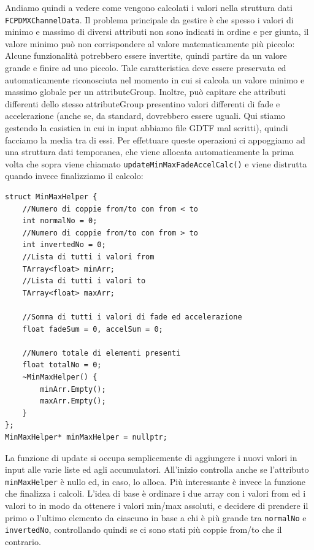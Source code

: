 \documentclass[main.tex]{subfiles}
\begin{document}
Andiamo quindi a vedere come vengono calcolati i valori nella struttura dati \lstinline{FCPDMXChannelData}. Il problema principale da gestire è che spesso i valori di minimo e massimo di diversi attributi non sono indicati in ordine e per giunta, il valore minimo può non corrispondere al valore matematicamente più piccolo: Alcune funzionalità potrebbero essere invertite, quindi partire da un valore grande e finire ad uno piccolo. Tale caratteristica deve essere preservata ed automaticamente riconosciuta nel momento in cui si calcola un valore minimo e massimo globale per un attributeGroup. Inoltre, può capitare che attributi differenti dello stesso attributeGroup presentino valori differenti di fade e accelerazione (anche se, da standard, dovrebbero essere uguali. Qui stiamo gestendo la casistica in cui in input abbiamo file GDTF mal scritti), quindi facciamo la media tra di essi. Per effettuare queste operazioni ci appoggiamo ad una struttura dati temporanea, che viene allocata automaticamente la prima volta che sopra viene chiamato \lstinline{updateMinMaxFadeAccelCalc()} e viene distrutta quando invece finalizziamo il calcolo:
\begin{lstlisting}
struct MinMaxHelper {
    //Numero di coppie from/to con from < to
    int normalNo = 0;
    //Numero di coppie from/to con from > to
    int invertedNo = 0;
    //Lista di tutti i valori from
    TArray<float> minArr;
    //Lista di tutti i valori to
    TArray<float> maxArr;

    //Somma di tutti i valori di fade ed accelerazione
    float fadeSum = 0, accelSum = 0;

    //Numero totale di elementi presenti
    float totalNo = 0;
    ~MinMaxHelper() {
        minArr.Empty();
        maxArr.Empty();
    }
};
MinMaxHelper* minMaxHelper = nullptr;
\end{lstlisting}
La funzione di update si occupa semplicemente di aggiungere i nuovi valori in input alle varie liste ed agli accumulatori. All'inizio controlla anche se l'attributo \lstinline{minMaxHelper} è nullo ed, in caso, lo alloca. Più interessante è invece la funzione che finalizza i calcoli. L'idea di base è ordinare i due array con i valori from ed i valori to in modo da ottenere i valori min/max assoluti, e decidere di prendere il primo o l'ultimo elemento da ciascuno in base a chi è più grande tra \lstinline{normalNo} e \lstinline{invertedNo}, controllando quindi se ci sono stati più coppie from/to  che il contrario.
\end{document}
